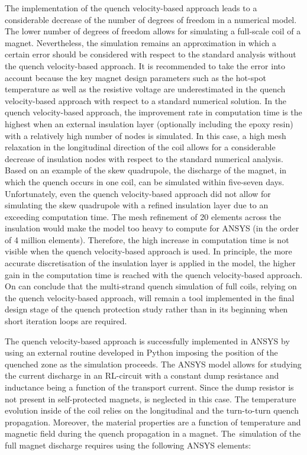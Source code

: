 
The implementation of the quench velocity-based approach leads to a considerable decrease of the number of degrees of freedom in a numerical model. The lower number of degrees of freedom allows for simulating a full-scale coil of a magnet. Nevertheless, the simulation remains an approximation in which a certain error should be considered with respect to the standard analysis without the quench velocity-based approach. It is recommended to take the error into account because the key magnet design parameters such as the hot-spot temperature as well as the resistive voltage are underestimated in the quench velocity-based approach with respect to a standard numerical solution. In the quench velocity-based approach, the improvement rate in computation time is the highest when an external insulation layer (optionally including the epoxy resin) with a relatively high number of nodes is simulated. In this case, a high mesh relaxation in the longitudinal direction of the coil allows for a considerable decrease of insulation nodes with respect to the standard numerical analysis. Based on an example of the skew quadrupole, the discharge of the magnet, in which the quench occurs in one coil, can be simulated within five-seven days. Unfortunately, even the quench velocity-based approach did not allow for simulating the skew quadrupole with a refined insulation layer due to an exceeding computation time. The mesh refinement of 20 elements across the insulation would make the model too heavy to compute for ANSYS (in the order of 4 million elements). Therefore, the high increase in computation time is not visible when the quench velocity-based approach is used. In principle, the more accurate discretisation of the insulation layer is applied in the model, the higher gain in the computation time is reached with the quench velocity-based approach. On can conclude that the multi-strand quench simulation of full coils, relying on the quench velocity-based approach, will remain a tool implemented in the final design stage of the quench protection study rather than in its beginning when short iteration loops are required.

The quench velocity-based approach is successfully implemented in ANSYS by using an external routine developed in Python imposing the position of the quenched zone as the simulation proceeds. The ANSYS model allows for studying the current discharge in an RL-circuit with a constant dump resistance and inductance being a function of the transport current. Since the dump resistor is not present in self-protected magnets, is neglected in this case. The temperature evolution inside of the coil relies on the longitudinal and the turn-to-turn quench propagation. Moreover, the material properties are a function of temperature and magnetic field during the quench propagation in a magnet. The~simulation of the full magnet discharge requires using the following ANSYS elements: 

